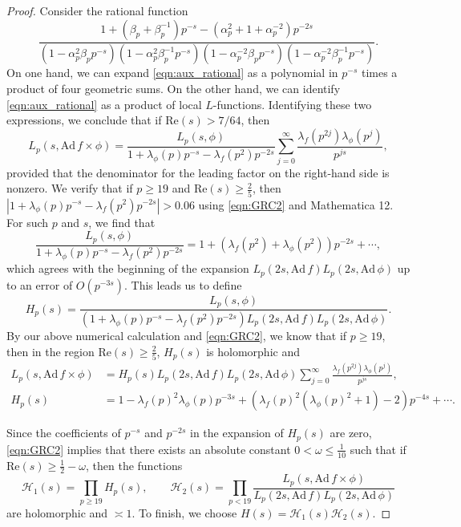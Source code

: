 \documentclass[12pt,reqno]{amsart}
\theoremstyle{remark}
\numberwithin{equation}{section}
\begin{document}
\begin{proof}
Consider the rational function
\begin{equation}
\label{eqn:aux_rational}
\frac{1+(\beta_p+\beta_p^{-1})p^{-s}-(\alpha_p^2+1+\alpha_p^{-2})p^{-2s}}{(1-\alpha_p^2 \beta_p p^{-s})(1-\alpha_p^2 \beta_p^{-1}p^{-s})(1-\alpha_p^{-2} \beta_p p^{-s})(1-\alpha_p^{-2} \beta_p^{-1}p^{-s})}.
\end{equation}
On one hand, we can expand \eqref{eqn:aux_rational} as a polynomial in $p^{-s}$ times a product of four geometric sums.  On the other hand, we can identify \eqref{eqn:aux_rational} as a product of local $L$-functions.  Identifying these two expressions, we conclude that if $\mathrm{Re}(s)>7/64$, then
\begin{equation}
\label{eqn:key}
L_p(s,\mathrm{Ad}\,f\times\phi)=\frac{L_p(s,\phi)}{1+\lambda_{\phi}(p)p^{-s}-\lambda_{f}(p^2)p^{-2s}}\sum_{j=0}^{\infty}\frac{\lambda_{f}(p^{2j})\lambda_{\phi}(p^j)}{p^{js}},
\end{equation}
provided that the denominator for the leading factor on the right-hand side is nonzero.  We verify that if $p\geq 19$ and $\mathrm{Re}(s)\geq \frac{2}{5}$, then $|1+\lambda_{\phi}(p)p^{-s}-\lambda_{f}(p^2)p^{-2s}|>0.06$ using \eqref{eqn:GRC2} and Mathematica 12.  For such $p$ and $s$, we find that
\begin{equation}
\label{eqn:G_def}
\frac{L_p(s,\phi)}{1+\lambda_{\phi}(p)p^{-s}-\lambda_{f}(p^2)p^{-2s}}=1+(\lambda_{f}(p^2)+\lambda_{\phi}(p^2))p^{-2s} +\cdots,
\end{equation}
which agrees with the beginning of the expansion $L_p(2s,\mathrm{Ad}\,f)L_{p}(2s,\mathrm{Ad}\,\phi)$ up to an error of $O(p^{-3s})$. This leads us to define
\[
H_p(s) = \frac{L_p(s,\phi)}{(1+\lambda_{\phi}(p)p^{-s}-\lambda_{f}(p^2)p^{-2s})L_p(2s,\mathrm{Ad}\, f)L_p(2s,\mathrm{Ad}\,\phi)}.
\]
By our above numerical calculation and \eqref{eqn:GRC2}, we know that if $p\geq 19$,  then in the region $\mathrm{Re}(s)\geq \frac{2}{5}$, $H_p(s)$ is holomorphic and
\begin{align*}
L_p(s,\mathrm{Ad}\,f\times\phi) &= H_p(s)L_p(2s,\mathrm{Ad}\, f)L_p(2s,\mathrm{Ad}\,\phi)\sum_{j=0}^{\infty}\frac{\lambda_{f}(p^{2j})\lambda_{\phi}(p^j)}{p^{js}},\\
H_p(s)&=1-\lambda_{f}(p)^2\lambda_{\phi}(p)p^{-3s}+(\lambda_{f}(p)^2(\lambda_{\phi}(p)^2+1)-2)p^{-4s}+\cdots.
\end{align*}

Since the coefficients of $p^{-s}$ and $p^{-2s}$ in the expansion of $H_p(s)$ are zero, \eqref{eqn:GRC2} implies that there exists an absolute constant $0<\omega\leq\frac{1}{10}$ such that if $\mathrm{Re}(s)\geq \frac{1}{2}-\omega$, then the functions
\[
\mathcal{H}_1(s)=\prod_{p\geq 19}H_p(s),\qquad \mathcal{H}_2(s) = \prod_{p<19}\frac{L_p(s,\mathrm{Ad}\,f\times\phi)}{L_p(2s,\mathrm{Ad}\,f)L_p(2s,\mathrm{Ad}\,\phi)}
\]
are holomorphic and $\asymp 1$.  To finish, we choose $H(s) = \mathcal{H}_1(s)\mathcal{H}_2(s)$.
\end{proof}
\end{document}
